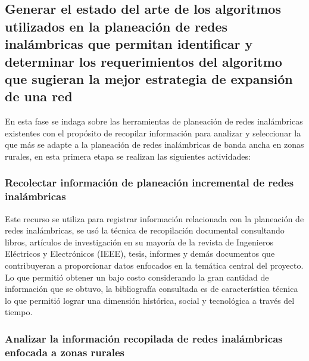 \documentclass[]{article}
\begin{document}
\subsection{Generar el estado del arte de los algoritmos utilizados en
la planeación de redes inalámbricas que permitan identificar y
determinar los requerimientos del algoritmo que sugieran la mejor
estrategia de expansión de una
red}\label{generar-el-estado-del-arte-de-los-algoritmos-utilizados-en-la-planeaciuxf3n-de-redes-inaluxe1mbricas-que-permitan-identificar-y-determinar-los-requerimientos-del-algoritmo-que-sugieran-la-mejor-estrategia-de-expansiuxf3n-de-una-red}

En esta fase se indaga sobre las herramientas de planeación de redes
inalámbricas existentes con el propósito de recopilar información para
analizar y seleccionar la que más se adapte a la planeación de redes
inalámbricas de banda ancha en zonas rurales, en esta primera etapa se
realizan las siguientes actividades:

\subsubsection{\texorpdfstring{\textbf{Recolectar información de
planeación incremental de redes
inalámbricas}}{Recolectar información de planeación incremental de redes inalámbricas}}\label{recolectar-informaciuxf3n-de-planeaciuxf3n-incremental-de-redes-inaluxe1mbricas}

Este recurso se utiliza para registrar información relacionada con la
planeación de redes inalámbricas, se usó la técnica de recopilación
documental consultando libros, artículos de investigación en su mayoría
de la revista de Ingenieros Eléctricos y Electrónicos (IEEE), tesis,
informes y demás documentos que contribuyeran a proporcionar datos
enfocados en la temática central del proyecto. Lo que permitió obtener
un bajo costo considerando la gran cantidad de información que se
obtuvo, la bibliografía consultada es de característica técnica lo que
permitió lograr una dimensión histórica, social y tecnológica a través
del tiempo.

\subsubsection{\texorpdfstring{\textbf{Analizar la información
recopilada de redes inalámbricas enfocada a zonas
rurales}}{Analizar la información recopilada de redes inalámbricas enfocada a zonas rurales}}\label{analizar-la-informaciuxf3n-recopilada-de-redes-inaluxe1mbricas-enfocada-a-zonas-rurales}
\end{document}
